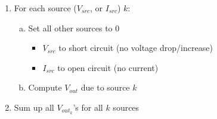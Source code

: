 \documentclass{article}\usepackage{amsmath,amssymb,amsthm,tikz,tkz-graph,color,chngpage,soul,hyperref,csquotes,graphicx,floatrow}\newcommand*{\QEDB}{\hfill\ensuremath{\square}}\newtheorem*{prop}{Proposition}\renewcommand{\theenumi}{\alph{enumi}}\usepackage[shortlabels]{enumitem}\usepackage[nobreak=true]{mdframed}\usetikzlibrary{matrix,calc}\MakeOuterQuote{"}\usepackage[margin=0.75in]{geometry} \newtheorem{theorem}{Theorem}
\begin{document}
\begin{enumerate}[1.]
    \item For each source ($V_{src}$, or $I_{src}$) $k$:
    \begin{enumerate}[a.]
        \item Set all other sources to 0
        \begin{itemize}
            \item $V_{src}$ to short circuit (no voltage drop/increase)
            \item $I_{src}$ to open circuit (no current)
        \end{itemize}
        \item Compute $V_{out}$ due to source $k$
    \end{enumerate}
    \item Sum up all $V_{out_k}$'s for all $k$ sources
\end{enumerate}
\end{document}
